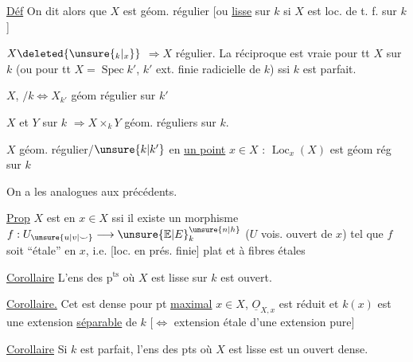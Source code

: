 \uline{Déf} On dit alors que $X$ est géom. régulier [ou \uline{lisse} sur $k$ si $X$ est loc. de t. f. sur $k$]

$X\deleted{\unsure{{}_k|{}_x}}$  $\Longrightarrow X$ régulier. La réciproque est vraie pour tt $X$ sur $k$ (ou  pour tt $X=\operatorname{Spec}k'$, $k'$ ext. finie radicielle de $k$) ssi $k$ est parfait.

$X$,  $/k\Longleftrightarrow X_{k'}$ géom régulier sur $k'$

$X$ et $Y$  sur $k$ $\Longrightarrow X\times_kY$ géom. réguliers sur $k$.

$X$  géom. régulier/$\unsure{k|k'}$ en \uline{un point} $x\in X$ : $\operatorname{Loc}_x(X)$ est géom rég sur $k$ 

On a les  analogues aux précédents.


\uline{Prop} $X$  est  en $x\in X$ ssi il existe un  morphisme $f:U_{\unsure{u|v|\smile}}\longrightarrow{\unsure{\mathbb E|E}}^{\unsure{n|h}}_k$ ($U$ vois. ouvert de $x$) tel que $f$ soit ``étale'' en $x$, i.e. [loc. en prés. finie] plat et à fibres étales

\uline{Corollaire} L'ens des p$^{\mathrm{ts}}$ où $X$ est  lisse sur $k$ est ouvert.


\uline{Corollaire.} Cet  est dense  pour  pt \uline{maximal} $x\in X$, $\underline O_{X,x}$ est réduit et $k(x)$ est une extension \uline{séparable} de $k$ $[\Leftrightarrow$  extension étale d'une extension  pure$]$

\uline{Corollaire} Si $k$ est parfait, l'ens des pts où $X$ est lisse est un ouvert dense.

